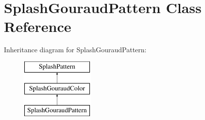 \hypertarget{class_splash_gouraud_pattern}{}\section{Splash\+Gouraud\+Pattern Class Reference}
\label{class_splash_gouraud_pattern}
Inheritance diagram for Splash\+Gouraud\+Pattern\+:\begin{figure}[H]
\begin{center}
\leavevmode
\includegraphics[height=3.000000cm]{class_splash_gouraud_pattern}
\end{center}
\end{figure}
